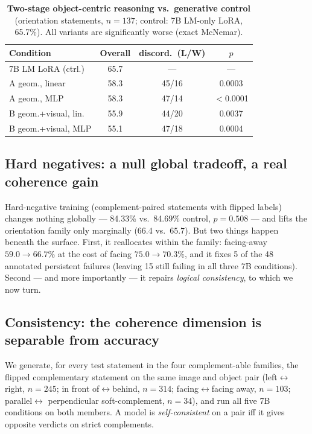 \begin{table}[t]
\centering
\footnotesize
\setlength{\tabcolsep}{3pt}
\begin{threeparttable}
\caption{\textbf{Two-stage object-centric reasoning vs.\ generative control}
(orientation statements, $n{=}137$; control: 7B LM-only LoRA, 65.7\%). All
variants are significantly worse (exact McNemar).}
\label{tab:twostage}
\begin{tabular}{lccc}
\toprule
Condition & Overall & discord.\ (L/W) & $p$ \\
\midrule
7B LM LoRA (ctrl.) & 65.7 & --- & --- \\
A geom., linear & 58.3 & 45/16 & 0.0003 \\
A geom., MLP & 58.3 & 47/14 & $<$0.0001 \\
B geom.+visual, lin. & 55.9 & 44/20 & 0.0037 \\
B geom.+visual, MLP & 55.1 & 47/18 & 0.0004 \\
\bottomrule
\end{tabular}
\end{threeparttable}
\end{table}

\subsection{Hard negatives: a null global tradeoff, a real coherence gain}
Hard-negative training (complement-paired statements with flipped labels)
changes nothing globally --- 84.33\% vs.\ 84.69\% control, $p{=}0.508$ --- and
lifts the orientation family only marginally ($66.4$ vs.\ $65.7$). But two things
happen beneath the surface. First, it reallocates within the family: facing-away
$59.0\rightarrow66.7\%$ at the cost of facing $75.0\rightarrow70.3\%$, and it
fixes 5 of the 48 annotated persistent failures (leaving 15 still failing in all
three 7B conditions). Second --- and more importantly --- it repairs
\emph{logical consistency}, to which we now turn.

\subsection{Consistency: the coherence dimension is separable from accuracy}
We generate, for every test statement in the four complement-able families, the
flipped complementary statement on the same image and object pair
(left$\leftrightarrow$right, $n{=}245$; in front of$\leftrightarrow$behind,
$n{=}314$; facing$\leftrightarrow$facing away, $n{=}103$; parallel$ \leftrightarrow$
perpendicular soft-complement, $n{=}34$), and run all five 7B conditions on both
members. A model is \emph{self-consistent} on a pair iff it gives opposite
verdicts on strict complements.

